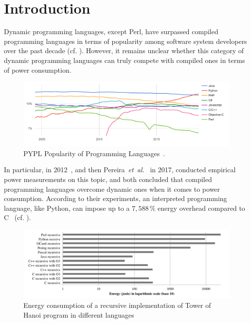 
\section{Introduction}

Dynamic programming languages, except Perl, have surpassed compiled programming languages in terms of popularity among software system developers over the past decade (cf. ).
However, it remains unclear whether this category of dynamic programming languages can truly compete with compiled ones in terms of power consumption.

\begin{figure}[htbp]
    \includegraphics[width=\linewidth]{imgs/programminglanguangespopularity.png}
    \caption{PYPL Popularity of Programming Languages~\cite{noauthor_pypl_2018}.}
    \label{fig:pypl}
\end{figure}

In particular, \citeauthor{noureddine_preliminary_2012} in 2012~\cite{noureddine_preliminary_2012}, and then Pereira~\emph{et~al.}~\cite{pereira_energy_2017} in 2017, conducted empirical power measurements on this topic, and both concluded that compiled programming languages overcome dynamic ones when it comes to power consumption.
According to their experiments, an interpreted programming language, like Python, can impose up to a $7,588\,\%$ energy overhead compared to C~\cite{pereira_energy_2017} (cf. ).
\begin{figure}[htbp]
    \includegraphics[width=\linewidth]{imgs/hannoiimplementation.png}
    \caption{Energy consumption of a recursive implementation of Tower of Hanoi program in different languages~\cite{noureddine_preliminary_2012}}
    \label{fig:hannoi}
\end{figure}

